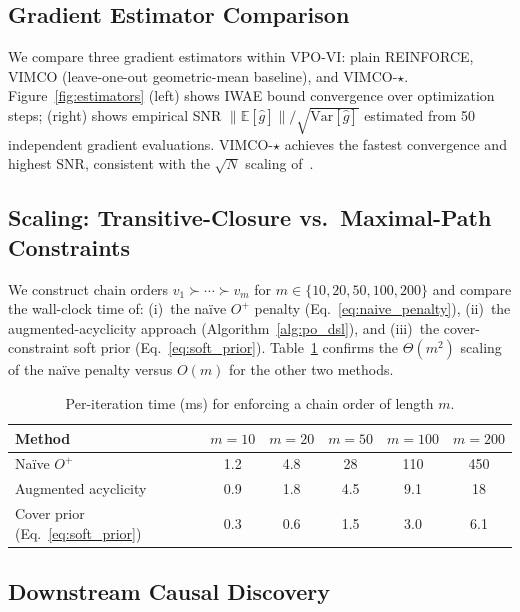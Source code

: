 \documentclass{article}
\theoremstyle{definition}
\theoremstyle{remark}
\newcommand{\E}{\mathbb{E}}
\newcommand{\Var}{\mathrm{Var}}
\begin{document}
\subsection{Gradient Estimator Comparison}
\label{sec:exp_estimator}

We compare three gradient estimators within VPO-VI: plain REINFORCE,
VIMCO (leave-one-out geometric-mean baseline), and VIMCO-$\star$.
Figure~\ref{fig:estimators} (left) shows IWAE bound convergence over
optimization steps; (right) shows empirical SNR
$\|\E[\hat g]\|/\sqrt{\Var[\hat g]}$ estimated from 50 independent
gradient evaluations.
VIMCO-$\star$ achieves the fastest convergence and highest SNR,
consistent with the $\sqrt{N}$ scaling
of~\citet{daudel2026importance}.

\subsection{Scaling: Transitive-Closure vs.\ Maximal-Path Constraints}
\label{sec:exp_scaling}

We construct chain orders $v_1\succ\cdots\succ v_m$ for
$m\in\{10,20,50,100,200\}$ and compare the wall-clock time of:
(i)~the na\"ive $O^+$ penalty (Eq.~\ref{eq:naive_penalty}),
(ii)~the augmented-acyclicity approach (Algorithm~\ref{alg:po_dsl}), and
(iii)~the cover-constraint soft prior (Eq.~\ref{eq:soft_prior}).
Table~\ref{tab:scaling} confirms the $\Theta(m^2)$ scaling of the
na\"ive penalty versus $O(m)$ for the other two methods.

\begin{table}[t]
\centering
\caption{Per-iteration time (ms) for enforcing a chain order of length
$m$.}
\label{tab:scaling}
\begin{tabular}{lccccc}
\toprule
\textbf{Method} & $m\!=\!10$ & $m\!=\!20$ & $m\!=\!50$
  & $m\!=\!100$ & $m\!=\!200$ \\
\midrule
Na\"ive $O^+$ & 1.2 & 4.8 & 28 & 110 & 450 \\
Augmented acyclicity & 0.9 & 1.8 & 4.5 & 9.1 & 18 \\
Cover prior (Eq.~\ref{eq:soft_prior}) & 0.3 & 0.6 & 1.5 & 3.0 & 6.1 \\
\bottomrule
\end{tabular}
\end{table}

\subsection{Downstream Causal Discovery}
\label{sec:exp_causal}
\end{document}
